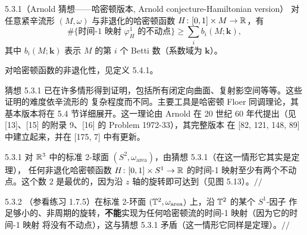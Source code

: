 \begin{wconj}{5.3.1}（Arnold 猜想——哈密顿版本, Arnold conjecture-Hamiltonian version）
  对任意紧辛流形 $(M,\omega)$ 与非退化的哈密顿函数 $H\colon[0,1]\times M\to\mathbb{R}$，有
  \begin{equation*}
    \#\{\text{时间-}1\text{ 映射 }\varphi_H^1\text{ 的不动点}\}
      \geqslant\sum_i b_i(M;\mathbf{k}),
  \end{equation*}
  其中 $b_i(M;\mathbf{k})$ 表示 $M$ 的第 $i$ 个 Betti 数（系数域为 $\mathbf{k}$）。
\end{wconj}

对哈密顿函数的非退化性，见定义 5.4.1。

猜想 5.3.1 已在许多情形得到证明，包括所有闭定向曲面、复射影空间等等。这些证明的难度依辛流形的
复杂程度而不同。主要工具是哈密顿 Floer 同调理论，其基本版本将在 5.4 节详细展开。这一理论由
Arnold 在 20 世纪 60 年代提出（见 [13]、[15] 的附录 9、[16] 的 Problem 1972-33），其完整版本
在 [82, 121, 148, 89] 中建立起来，并在 [175, 7] 中有更新。

\begin{wexam}{5.3.1}
  对 $\mathbb{R}^3$ 中的标准 2-球面 $(S^2,\omega_{\mathrm{area}})$，由猜想 5.3.1（在这一情形它其实是定理），
  任何非退化哈密顿函数 $H\colon[0,1]\times S^1\to\mathbb{R}$ 的时间-1 映射至少有两个不动点。这个数 $2$
  是最优的，因为沿 $z$ 轴的旋转即可达到（见图 5.13）。\hfill$//$
\end{wexam}

\begin{wexam}{5.3.2}
  （参看练习 1.7.5）在标准 2-环面 $(\mathbb{T}^2,\omega_{\mathrm{area}})$ 上，沿 $\mathbb{T}^2$ 的某个 $S^1$-因子
  作足够小的、非周期的旋转，\textbf{不能}实现为任何哈密顿流的时间-1 映射（因为它的时间-1 映射
  将没有不动点），这与猜想 5.3.1 矛盾（这一情形它同样是定理）。\hfill$//$
\end{wexam}

